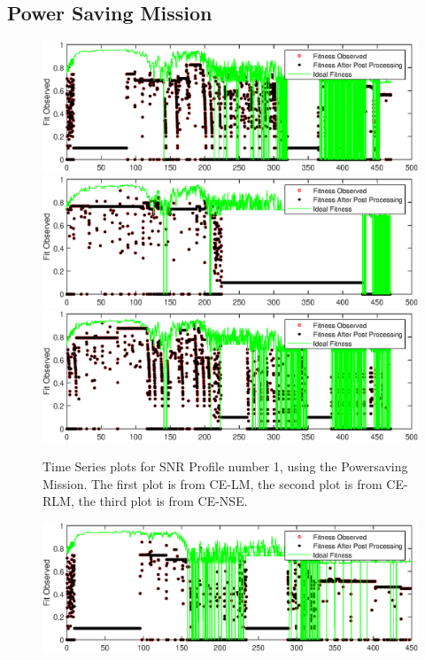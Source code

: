 \begin{appendices}
\subsection{Power Saving Mission}
\begin{figure}[ht!]
\includegraphics{figures/c_sim_timeSeries/Fitness_timeSeries_LM_1.eps}
\includegraphics{figures/c_sim_timeSeries/Fitness_timeSeries_RLM_1.eps}
\includegraphics{figures/c_sim_timeSeries/Fitness_timeSeries_NSE_1.eps}
\caption{Time Series plots for SNR Profile number 1, using the Powersaving Mission. The first plot is from CE-LM, the second plot is from CE-RLM, the third plot is from CE-NSE.}
\end{figure}
\begin{figure}[ht!]
\includegraphics{figures/c_sim_timeSeries/Fitness_timeSeries_LM_2.eps}

\end{figure}
\end{appendices}
